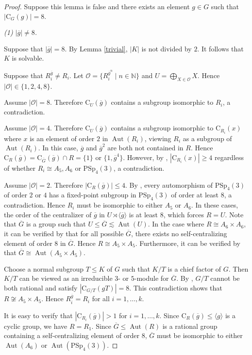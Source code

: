 \documentclass[11pt]{article}
\providecommand{\bbN}{{\mathbb N}} %
\providecommand{\PSp}{{\mathrm{PSp}}}
\providecommand{\C}{{\mathrm{C}}}
\providecommand{\Aut}{{\operatorname{Aut}}}
\providecommand{\gen}[1]{\langle #1 \rangle} %
\providecommand{\gen}[1]{\langle #1 \rangle} %
\providecommand{\gen}[1]{\langle #1 \rangle} %
\providecommand{\olg}{{\overline{g}}}
\providecommand{\olG}{{\overline{G}}}
\providecommand{\calO}{\mathcal{O}}
\providecommand{\bbN}{\mathbb{N}}
\begin{document}
\begin{proof}
    Suppose this lemma is false and there exists an element $g\in G$ such that $|\C_G(g)|=8$.

{\sl (1) $|\olg|\neq 8$. } 

    Suppose that $|\olg|=8$. 
    By Lemma \ref{trivial}, $|K|$ is not divided by $2$.
    It follows that $K$ is solvable.

    Suppose that $R_i^{\olg} \neq R_i$.
    Let $\calO = \{R_i^{\olg^n}\mid n\in \bbN\}$ and $U=\bigoplus_{X\in \calO} X$.
    Hence $|\calO|\in \{1,2,4,8\}$.
    
    Assume $|\calO|=8$. Therefore $\C_U(\olg)$ contains a subgroup isomorphic to $R_i$, a contradiction.
    
    Assume $|\calO|=4$. Therefore $\C_U(\olg)$ contains a subgroup isomorphic to $\C_{R_i}(x)$ 
    where $x$ is an element of order $2$ in $\Aut(R_i)$,
    viewing $R_i$ as a subgroup of $\Aut(R_i)$.
    In this case, $\olg$ and $\olg^2$ are both not contained in $R$.
    Hence $\C_R(\olg)=\C_{\olG}(\olg)\cap R = \{1\}$ or $\{1,\olg^4\}$.
    However, by \cite[Code 1]{Git},
    $|\C_{R_i}(x)|\geq 4$ regardless of whether $R_i\cong A_5, A_6$ or $\PSp_4(3)$, a contradiction.
    
    Assume $|\calO|=2$. Therefore $|\C_{R}(\olg)|\leq 4$.
    By \cite[Code 1]{Git}, 
    every automorphism of $\PSp_4(3)$ of order $2$ or $4$
    has a fixed-point subgroup in $\PSp_4(3)$ of order at least $8$, a contradiction.
    Hence $R_i$ must be isomorphic to either $A_5$ or $A_6$.
    In these cases, the order of the centralizer of $\olg$ in $U\rtimes \gen{\olg}$ is at least $8$, 
    which forces $R=U$.
    Note that $\olG$ is a group such that $U\leq \olG \lesssim \Aut(U)$.
    In the case where $R\cong A_6\times A_6$,
    it can be verified by \cite[Code 7]{Git} that for all possible $\olG$, 
    there exists no self-centralizing element of order $8$ in $\olG$.
    Hence $R\cong A_5\times A_5$.
    Furthermore, it can be verified by \cite[Code 3]{Git} that $\olG\cong \Aut(A_5\times A_5)$.

    Choose a normal subgroup $T\leq K$ of $G$ such that $K/T$ is a chief factor of $G$.
    Then $K/T$ can be viewed as an irreducible $3$- or $5$-module for $\olG$.
    By \cite[Code 8]{Git}, $G/T$ cannot be both rational and satisfy $|\C_{G/T}(gT)|=8$.
    This contradiction shows that $R\not\cong A_5\times A_5$. 
    Hence $R_i^{\olg}=R_i$ for all $i=1,\ldots,k$.

    It is easy to verify that $|\C_{R_i}(\olg)|>1$ for $i=1,\ldots,k$. 
    Since $\C_R(\olg)\leq \gen{g}$ is a cyclic group, we have $R=R_1$.
    Since $\overline{G}\leq \Aut(R)$ is a rational group containing a self-centralizing element of order $8$,
    $\overline{G}$ must be isomorphic to either $\Aut(A_6)$ or $\Aut(\PSp_4(3))$. 


\end{proof}
\end{document}
